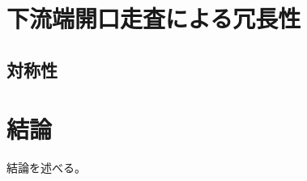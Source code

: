 \section{下流端開口走査による冗長性}

\subsection{対称性}

\clearpage
\newpage


\section{結論}
\label{chap3_conclusion}
結論を述べる。




